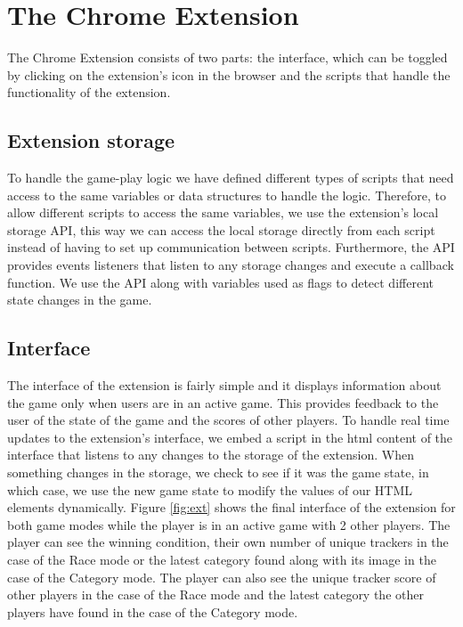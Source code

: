 \documentclass{l4proj}
\begin{document}
\section{The Chrome Extension}
The Chrome Extension consists of two parts: the interface, which can be toggled by clicking on the extension's icon in the browser and the scripts that handle the functionality of the extension.

\subsection{Extension storage}
To handle the game-play logic we have defined different types of scripts that need access to the same variables or data structures to handle the logic. Therefore, to allow different scripts to access the same variables, we use the extension's local storage API, this way we can access the local storage directly from each script instead of having to set up communication between scripts. Furthermore, the API provides events listeners that listen to any storage changes and execute a callback function. We use the API along with variables used as flags to detect different state changes in the game.

\subsection{Interface}
The interface of the extension is fairly simple and it displays information about the game only when users are in an active game. This provides feedback to the user of the state of the game and the scores of other players. To handle real time updates to the extension's interface, we embed a script in the html content of the interface that listens to any changes to the storage of the extension. When something changes in the storage, we check to see if it was the game state, in which case, we use the new game state to modify the values of our HTML elements dynamically. Figure \ref{fig:ext} shows the final interface of the extension for both game modes while the player is in an active game with 2 other players. The player can see the winning condition, their own number of unique trackers in the case of the Race mode or the latest category found along with its image in the case of the Category mode. The player can also see the unique tracker score of other players in the case of the Race mode and the latest category the other players have found in the case of the Category mode.
\end{document}
